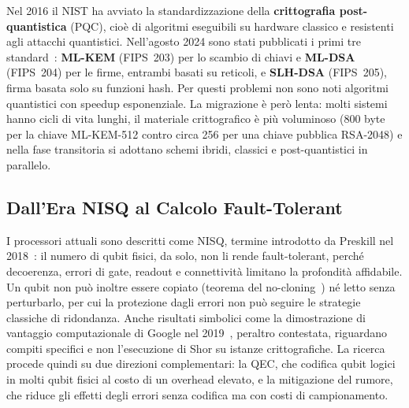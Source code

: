 \begin{onehalfspace}
Nel 2016 il \ac{NIST} ha avviato la standardizzazione della \textbf{crittografia post-quantistica} (\ac{PQC}), cioè di algoritmi eseguibili su hardware classico e resistenti agli attacchi quantistici. Nell'agosto 2024 sono stati pubblicati i primi tre standard~\cite{nist2024pqc}: \textbf{ML-KEM} (FIPS~203) per lo scambio di chiavi e \textbf{ML-DSA} (FIPS~204) per le firme, entrambi basati su reticoli, e \textbf{SLH-DSA} (FIPS~205), firma basata solo su funzioni hash. Per questi problemi non sono noti algoritmi quantistici con speedup esponenziale. La migrazione è però lenta: molti sistemi hanno cicli di vita lunghi, il materiale crittografico è più voluminoso (800 byte per la chiave ML-KEM-512 contro circa 256 per una chiave pubblica RSA-2048) e nella fase transitoria si adottano schemi ibridi, classici e post-quantistici in parallelo.

\subsection{Dall'Era NISQ al Calcolo Fault-Tolerant}
\label{app:intro:nisq}

I processori attuali sono descritti come \ac{NISQ}, termine introdotto da Preskill nel 2018~\cite{preskill2018}: il numero di qubit fisici, da solo, non li rende fault-tolerant, perché decoerenza, errori di gate, readout e connettività limitano la profondità affidabile. Un qubit non può inoltre essere copiato (teorema del no-cloning~\cite{wootters1982}) né letto senza perturbarlo, per cui la protezione dagli errori non può seguire le strategie classiche di ridondanza. Anche risultati simbolici come la dimostrazione di vantaggio computazionale di Google nel 2019~\cite{arute2019}, peraltro contestata, riguardano compiti specifici e non l'esecuzione di Shor su istanze crittografiche. La ricerca procede quindi su due direzioni complementari: la \ac{QEC}, che codifica qubit logici in molti qubit fisici al costo di un overhead elevato, e la mitigazione del rumore, che riduce gli effetti degli errori senza codifica ma con costi di campionamento.

\end{onehalfspace}


